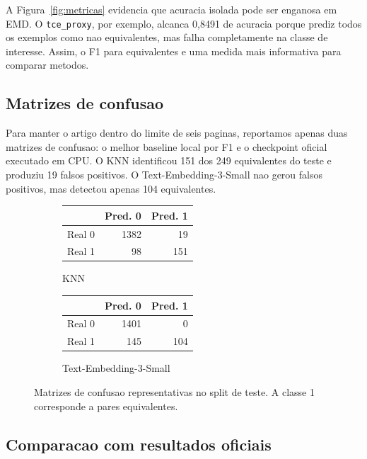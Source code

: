\documentclass[sigconf,screen,nonacm]{acmart}
\begin{document}
A Figura~\ref{fig:metricas} evidencia que acuracia isolada pode ser enganosa em EMD. O \texttt{tce\_proxy}, por exemplo, alcanca 0,8491 de acuracia porque prediz todos os exemplos como nao equivalentes, mas falha completamente na classe de interesse. Assim, o F1 para equivalentes e uma medida mais informativa para comparar metodos.

\subsection{Matrizes de confusao}

Para manter o artigo dentro do limite de seis paginas, reportamos apenas duas matrizes de confusao: o melhor baseline local por F1 e o checkpoint oficial executado em CPU. O KNN identificou 151 dos 249 equivalentes do teste e produziu 19 falsos positivos. O Text-Embedding-3-Small nao gerou falsos positivos, mas detectou apenas 104 equivalentes.

\begin{figure}[t]
  \centering
  \begin{subfigure}{0.48\linewidth}
    \centering
    \begin{tabular}{lrr}
      \toprule
       & Pred. 0 & Pred. 1 \\
      \midrule
      Real 0 & 1382 & 19 \\
      Real 1 & 98 & 151 \\
      \bottomrule
    \end{tabular}
    \caption{KNN}
  \end{subfigure}
  \hfill
  \begin{subfigure}{0.48\linewidth}
    \centering
    \begin{tabular}{lrr}
      \toprule
       & Pred. 0 & Pred. 1 \\
      \midrule
      Real 0 & 1401 & 0 \\
      Real 1 & 145 & 104 \\
      \bottomrule
    \end{tabular}
    \caption{Text-Embedding-3-Small}
  \end{subfigure}
  \caption{Matrizes de confusao representativas no split de teste. A classe 1 corresponde a pares equivalentes.}
  \label{fig:confusao}
\end{figure}

\subsection{Comparacao com resultados oficiais}
\end{document}
